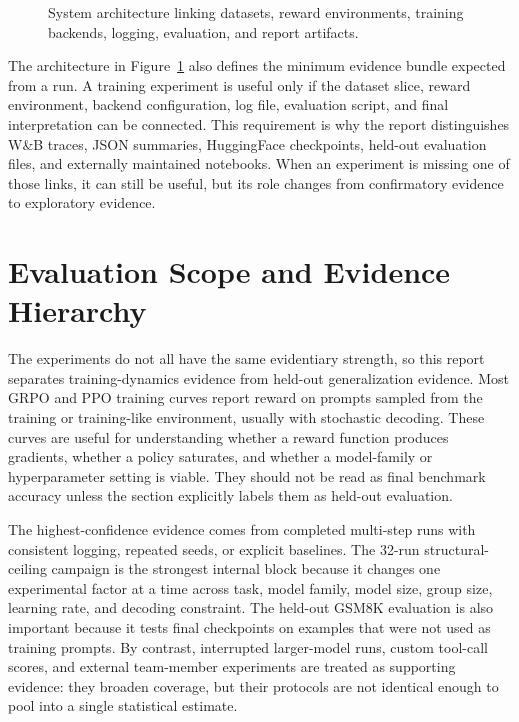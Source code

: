 \documentclass[12pt,a4paper]{report}
\newcommand{\fitdiagram}[1]{\resizebox{\textwidth}{!}{}}
\begin{document}
\begin{figure}[ht]
  \centering
  \fitdiagram{../../../platform_tinker/reports/final/tikz/system_architecture.tex}
  \caption{System architecture linking datasets, reward environments, training backends, logging, evaluation, and report artifacts.}
  \label{fig:system-architecture}
\end{figure}

The architecture in Figure~\ref{fig:system-architecture} also defines the minimum evidence bundle expected from a run. A training experiment is useful only if the dataset slice, reward environment, backend configuration, log file, evaluation script, and final interpretation can be connected. This requirement is why the report distinguishes W\&B traces, JSON summaries, HuggingFace checkpoints, held-out evaluation files, and externally maintained notebooks. When an experiment is missing one of those links, it can still be useful, but its role changes from confirmatory evidence to exploratory evidence.

\section{Evaluation Scope and Evidence Hierarchy}
\label{sec:evidence-hierarchy}

The experiments do not all have the same evidentiary strength, so this report separates training-dynamics evidence from held-out generalization evidence. Most GRPO and PPO training curves report reward on prompts sampled from the training or training-like environment, usually with stochastic decoding. These curves are useful for understanding whether a reward function produces gradients, whether a policy saturates, and whether a model-family or hyperparameter setting is viable. They should not be read as final benchmark accuracy unless the section explicitly labels them as held-out evaluation.

The highest-confidence evidence comes from completed multi-step runs with consistent logging, repeated seeds, or explicit baselines. The 32-run structural-ceiling campaign is the strongest internal block because it changes one experimental factor at a time across task, model family, model size, group size, learning rate, and decoding constraint. The held-out GSM8K evaluation is also important because it tests final checkpoints on examples that were not used as training prompts. By contrast, interrupted larger-model runs, custom tool-call scores, and external team-member experiments are treated as supporting evidence: they broaden coverage, but their protocols are not identical enough to pool into a single statistical estimate.
\end{document}
